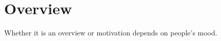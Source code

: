 \section{Overview}
\label{sec:motiv}

Whether it is an overview or motivation depends on people's mood.


